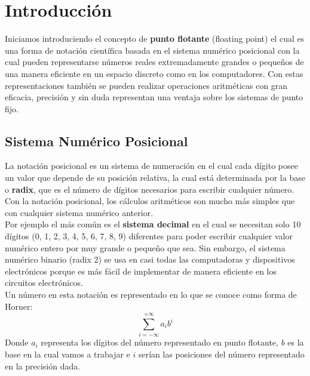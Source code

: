 \documentclass[a4paper,10pt,twocolumn]{article}
\begin{document}
	
	
	\section{Introducción}\label{sec:intro}
	Iniciamos introduciendo el concepto de \textbf{punto flotante} (floating point) el cual es una forma de notación científica basada en el sistema numérico posicional con la cual pueden representarse números reales extremadamente grandes o pequeños de una manera eficiente en un espacio discreto como en los computadores. Con estas representaciones también se pueden realizar operaciones aritméticas con gran eficacia, precisión y sin duda representan una ventaja sobre los sistemas de punto fijo.\\
	
	
	\subsection{Sistema Numérico Posicional}
	
	La notación posicional es un sistema de numeración en el cual cada dígito posee un valor que depende de su posición relativa, la cual está determinada por la base o \textbf{radix}, que es el número de dígitos necesarios para escribir cualquier número. Con la notación posicional, los cálculos aritméticos son mucho más simples que con cualquier sistema numérico anterior.\\
	
	Por ejemplo el más común es el \textbf{sistema decimal} en el cual se necesitan solo 10 dígitos (0, 1, 2, 3, 4, 5, 6, 7, 8, 9) diferentes para poder escribir cualquier valor numérico entero por muy grande o pequeño que sea. Sin embargo, el sistema numérico binario (radix 2) se usa en casi todas las computadoras y dispositivos electrónicos porque es más fácil de implementar de manera eficiente en los circuitos electrónicos. \\
	
	
	Un número en esta notación es representado en lo que se conoce como forma de Horner:
	\begin{equation}
		\sum_{i=-\infty}^{+\infty} a_i b^i
	\end{equation}
	Donde $a_i$ representa los dígitos del número representado en punto flotante, $b$ es la base en la cual vamos a trabajar e $i$ serían las posiciones del número representado en la precisión dada.\\   
	
\end{document}
